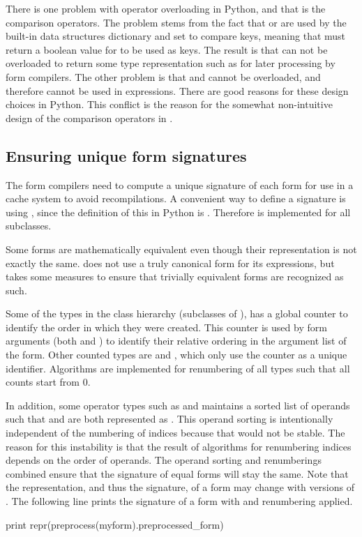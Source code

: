 There is one problem with operator overloading in Python, and that
is the comparison operators. The problem stems from the fact that
 or  are used by the built-in data
structures dictionary and set to compare keys, meaning that  must return a boolean value for  to be used as
keys. The result is that  can not be overloaded to return
some  type representation such as  for later processing by form compilers.  The other problem is
that  and  cannot be overloaded, and therefore cannot
be used in  expressions.  There are good reasons for
these design choices in Python.  This conflict is the reason for the
somewhat non-intuitive design of the comparison operators in \ufl{}.

\subsection{Ensuring unique form signatures}
\label{ufl:sec:signatures}

The form compilers need to compute a unique signature of each form for use
in a cache system to avoid recompilations.  A convenient way to define
a signature is using , since the definition of this in
Python is .  Therefore 
is implemented for all  subclasses.

Some forms are mathematically equivalent even though their representation
is not exactly the same. \ufl{} does not use a truly canonical form
for its expressions, but takes some measures to ensure that trivially
equivalent forms are recognized as such.

Some of the types in the  class hierarchy (subclasses of
), has a global counter to identify the order in which they
were created.  This counter is used by form arguments (both 
and ) to identify their relative ordering in the argument
list of the form.  Other counted types are  and ,
which only use the counter as a unique identifier.  Algorithms are
implemented for renumbering of all  types such that all
counts start from 0.

In addition, some operator types such as  and 
maintains a sorted list of operands such that  and 
are both represented as .  This operand sorting is
intentionally independent of the numbering of indices because that
would not be stable. The reason for this instability is that the
result of algorithms for renumbering indices depends on the order
of operands. The operand sorting and renumberings combined ensure
that the signature of equal forms will stay the same.  Note that the
representation, and thus the signature, of a form may change with
versions of \ufl{}.  The following line prints the signature of a form
with  and renumbering applied.
\begin{python}
print repr(preprocess(myform).preprocessed_form)
\end{python}

